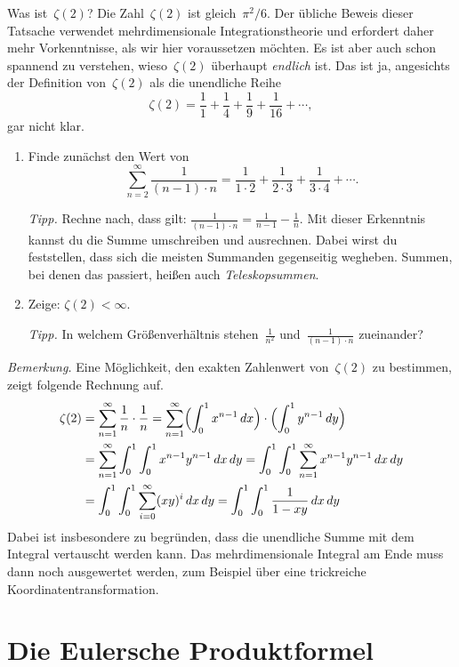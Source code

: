 \documentclass[twoside]{../zirkelblatt1415}
\theoremstyle{definition}
\theoremstyle{plain}
\theoremstyle{remark}
\begin{document}
\begin{aufgabe}{Was ist~$\zeta(2)$?}\label{aufg:zeta2}
Die Zahl~$\zeta(2)$ ist gleich~$\pi^2/6$. Der übliche Beweis dieser Tatsache
verwendet mehrdimensionale Integrationstheorie und erfordert daher mehr
Vorkenntnisse, als wir hier voraussetzen möchten. Es ist aber auch schon spannend
zu verstehen, wieso~$\zeta(2)$ überhaupt \emph{endlich} ist. Das ist ja,
angesichts der Definition von~$\zeta(2)$ als die unendliche Reihe
\[ \zeta(2) = \frac{1}{1} + \frac{1}{4} + \frac{1}{9} + \frac{1}{16} + \cdots,
\]
gar nicht klar.
\begin{enumerate}
\item Finde zunächst den Wert von
\[ \sum_{n=2}^\infty \frac{1}{(n-1) \cdot n} =
  \frac{1}{1 \cdot 2} + \frac{1}{2 \cdot 3} + \frac{1}{3 \cdot 4} + \cdots. \]

\emph{Tipp.} Rechne nach, dass gilt: $\frac{1}{(n-1) \cdot n} = \frac{1}{n-1} -
\frac{1}{n}$. Mit dieser Erkenntnis kannst du die Summe umschreiben und
ausrechnen. Dabei wirst du feststellen, dass sich die meisten Summanden
gegenseitig wegheben. Summen, bei denen das passiert, heißen auch
\emph{Teleskopsummen}.

\item Zeige: $\zeta(2) < \infty$.

\emph{Tipp.} In welchem Größenverhältnis stehen~$\frac{1}{n^2}$
und~$\frac{1}{(n-1) \cdot n}$ zueinander?
\end{enumerate}

\emph{Bemerkung.} Eine Möglichkeit, den exakten Zahlenwert von~$\zeta(2)$ zu
bestimmen, zeigt folgende Rechnung auf.
\begin{align*}
  \zeta(2) &=
  \sum_{n=1}^\infty \frac{1}{n} \cdot \frac{1}{n} =
  \sum_{n=1}^\infty \Bigl(\int_0^1 x^{n-1} \,dx\Bigr) \cdot
    \Bigl(\int_0^1 y^{n-1} \,dy\Bigr) \\
  &=
  \sum_{n=1}^\infty \int_0^1 \int_0^1 x^{n-1} y^{n-1} \,dx\,dy
  = \int_0^1 \int_0^1 \sum_{n=1}^\infty x^{n-1} y^{n-1} \,dx\,dy \\
  &= \int_0^1 \int_0^1 \sum_{i=0}^\infty (xy)^i \,dx\,dy
  = \int_0^1 \int_0^1 \frac{1}{1 - xy} \,dx\,dy
\end{align*}
Dabei ist insbesondere zu begründen, dass die unendliche Summe mit dem Integral
vertauscht werden kann. Das mehrdimensionale Integral am Ende muss
dann noch ausgewertet werden, zum Beispiel über eine trickreiche
Koordinatentransformation.
\end{aufgabe}


\section{Die Eulersche Produktformel}\label{sect:euler-produkt}
\end{document}

